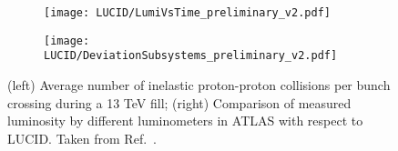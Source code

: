 \begin{figure}
\centering
\begin{subfigure}{.5\textwidth}
  \centering
  \texttt{[image: LUCID/LumiVsTime\_preliminary\_v2.pdf]}
  \label{fig:sub3}
\end{subfigure}%
\begin{subfigure}{.5\textwidth}
  \centering
  \texttt{[image: LUCID/DeviationSubsystems\_preliminary\_v2.pdf]}
  \label{fig:sub4}
\end{subfigure}
\caption{(left) Average number of inelastic proton-proton collisions per bunch crossing during a 13 TeV fill; 
(right) Comparison of measured luminosity by different luminometers in ATLAS with respect to LUCID. Taken from Ref.~\cite{publicPlots}.}
\label{fig:LumiVsTime}
\end{figure}


